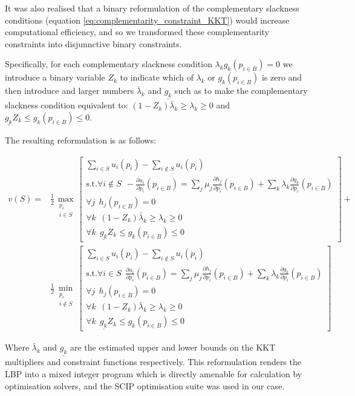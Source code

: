 It was also realised that a binary reformulation of the complementary slackness conditions (equation \ref{eq:complementarity_constraint_KKT}) would increase computational efficiency, and so we transformed these complementarity constraints into disjunnctive binary constraints.

Specifically, for each complementary slackness condition $\lambda_kg_k(p_{i\in B}) = 0$ we introduce a binary variable $Z_k$ to indicate which of $\lambda_k$ or $g_k(p_{i\in B})$ is zero and then introduce and larger numbers $\bar{\lambda}_k$ and $ \underline{g_k} $ such as to make the complementary slackness condition equivalent to: $(1-Z_k)\bar{\lambda}_k \ge \lambda_k \ge 0$ and $\underline{g_k}Z_k\le g_k(p_{i\in B})\le 0$.

The resulting reformulation is as follows:

\begin{equation}
\label{optimization_eq1}
\begin{aligned}
v(S) =&\frac{1}{2} 
\max_{\substack{p_i \\ i\in S}}\left[\substack{
	\sum_{i\in S}u_i(p_i) - \sum_{i\notin S}u_i(p_i)\\
	\text{s.t.}\forall i\notin S~~-\frac{\partial u_i}{\partial p_i}(p_{i\in B})=\sum_j\mu_j\frac{\partial h_j}{\partial p_i}(p_{i\in B}) + \sum_k\lambda_k\frac{\partial g_k}{\partial p_i}(p_{i\in B})\\
	\forall j~~ h_j(p_{i\in B})=0\\
	\forall k~~ (1-Z_k)\bar{\lambda}_k \ge \lambda_k \ge 0\\
	\forall k~~ \underline{g_k}Z_k\le g_k(p_{i\in B}) \le 0}
\right] +\\
&\frac{1}{2}\min_{\substack{p_i \\ i\notin S}}\left[\substack{
	\sum_{i\in S}u_i(p_i) - \sum_{i\notin S}u_i(p_i)\\
	\text{s.t.}\forall i\in S~~\frac{\partial u_i}{\partial p_i}(p_{i\in B})=\sum_j\mu_j\frac{\partial h_j}{\partial p_i}(p_{i\in B}) + \sum_k\lambda_k\frac{\partial g_k}{\partial p_i}(p_{i\in B})\\
	\forall j~~ h_j(p_{i\in B})=0\\
	\forall k~~ (1-Z_k)\bar{\lambda}_k \ge \lambda_k \ge 0\\
	\forall k~~ \underline{g_k}Z_k\le g_k(p_{i\in B}) \le 0}
\right]
\end{aligned}
\end{equation}

Where $\bar{\lambda}_k$ and $\underline{g_k}$ are the estimated upper and lower bounds on the KKT multipliers and constraint functions respectively.
This reformulation renders the LBP into a mixed integer program which is directly amenable for calculation by optimisation solvers, and the SCIP optimisation suite \cite{MaherFischerGallyetal.2017} was used in our case.

